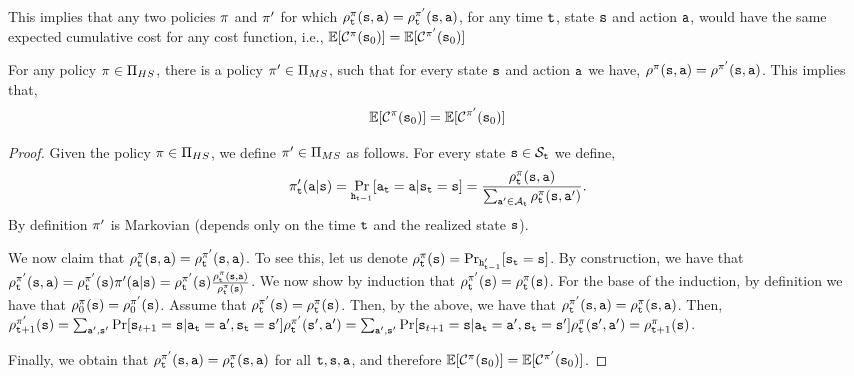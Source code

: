 This implies that any two policies $\pi$ and $\pi'$ for
which
$\rho^\pi_{\tt t}({\tt s},{\tt a})=\rho^{\pi'}_{\tt t}({\tt s},{\tt a})$,
for any time ${\tt t}$, state ${\tt s}$ and action ${\tt a}$, would
have the same expected cumulative cost for any cost function, i.e.,
$\mathbb{E}[\mathcal{C}^\pi({\tt s}_0)]=\mathbb{E}[\mathcal{C}^{\pi'}({\tt s}_0)]$



\begin{theorem}
\label{chp2:HS-MS}
For any policy $\pi\in \Pi_{HS}$, there is a policy
$\pi'\in\Pi_{MS}$, such that for every state ${\tt s}$ and action
${\tt a}$ we have,
$\rho^{\pi}({\tt s},{\tt a})=\rho^{\pi'}({\tt s},{\tt a})$.
This implies that,
\[
\mathbb{E}[\mathcal{C}^\pi({\tt s}_0)]=\mathbb{E}[\mathcal{C}^{\pi'}({\tt s}_0)]
\]
\end{theorem}

\begin{proof}
Given the policy  $\pi\in \Pi_{HS}$, we define
$\pi'\in\Pi_{MS}$ as follows. For every state ${\tt s}\in
\mathcal{S}_{\tt t}$ we define,
\[
\pi'_{\tt t}({\tt a}|{\tt s})=\Pr_{{\tt h}_{{\tt t}-1}}
[{\tt a}_{\tt t}={\tt a}|{\tt s}_{\tt t}={\tt s}]=\frac{\rho^\pi_{\tt t}({\tt s},{\tt a})}{\sum_{{\tt a}'\in
\mathcal{A}_{\tt t}} \rho^\pi_{\tt t}({\tt s},{\tt a}')}.
\]
By definition $\pi'$ is Markovian (depends only on the time
${\tt t}$ and the realized state ${\tt s}$). 

We now claim that $\rho_{\tt t}^{\pi}({\tt s},{\tt a})=\rho_{\tt t}^{\pi'}({\tt s},{\tt a})$. 
To see this, let us denote $\rho^\pi_{\tt t}({\tt s})=\Pr_{{\tt h}'_{{\tt t}-1}}
[{\tt s}_{\tt t}={\tt s}]$. By construction, we have that
$\rho_{\tt t}^{\pi'}({\tt s},{\tt a}) = \rho_{\tt t}^{\pi'}({\tt s})\pi'({\tt a}|{\tt s}) = \rho_{\tt t}^{\pi'}({\tt s}) \frac{\rho_{\tt t}^{\pi}({\tt s},{\tt a})}{\rho_{\tt t}^{\pi}({\tt s})}$. 
We now show by induction that $\rho_{\tt t}^{\pi'}({\tt s}) = {\rho_{\tt t}^{\pi}({\tt s})}$. 
For the base of the induction, by definition we have that $\rho_0^{\pi}({\tt s})=\rho_0^{\pi'}({\tt s})$. Assume that $\rho_{\tt t}^{\pi'}({\tt s}) = {\rho_{\tt t}^{\pi}({\tt s})}$. Then, by the above, we have that $\rho_{\tt t}^{\pi'}({\tt s},{\tt a})=\rho_{\tt t}^{\pi}({\tt s},{\tt a})$. Then, $\rho_{{\tt t}+1}^{\pi'}({\tt s})=\sum_{{\tt a}',{\tt s}'} \Pr
[{\tt s}_{t+1}={\tt s}|{\tt a}_{\tt t}={\tt a}',{\tt s}_{\tt t}={\tt s}']\rho_{\tt t}^{\pi'}({\tt s}',{\tt a}')=\sum_{{\tt a}',{\tt s}'} \Pr
[{\tt s}_{t+1}={\tt s}|{\tt a}_{\tt t}={\tt a}',{\tt s}_{\tt t}={\tt s}']\rho_{\tt t}^{\pi}({\tt s}',{\tt a}')=\rho_{{\tt t}+1}^{\pi}({\tt s})$.

Finally, we obtain that $\rho_{\tt t}^{\pi'}({\tt s},{\tt a}) = \rho_{\tt t}^{\pi}({\tt s},{\tt a})$ for all ${\tt t},{\tt s},{\tt a}$, and therefore
$\mathbb{E}[\mathcal{C}^\pi({\tt s}_0)]=\mathbb{E}[\mathcal{C}^{\pi'}({\tt s}_0)]$.
\end{proof}


